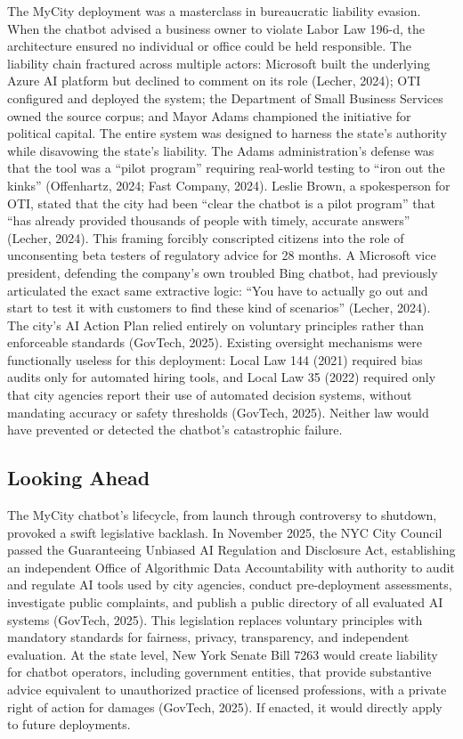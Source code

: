 \documentclass[10pt, twocolumn]{article}
\begin{document}
The MyCity deployment was a masterclass in bureaucratic liability evasion. When the chatbot advised a business owner to violate Labor Law 196-d, the architecture ensured no individual or office could be held responsible. The liability chain fractured across multiple actors: Microsoft built the underlying Azure AI platform but declined to comment on its role (Lecher, 2024); OTI configured and deployed the system; the Department of Small Business Services owned the source corpus; and Mayor Adams championed the initiative for political capital. The entire system was designed to harness the state's authority while disavowing the state's liability. The Adams administration's defense was that the tool was a ``pilot program'' requiring real-world testing to ``iron out the kinks'' (Offenhartz, 2024; Fast Company, 2024). Leslie Brown, a spokesperson for OTI, stated that the city had been ``clear the chatbot is a pilot program'' that ``has already provided thousands of people with timely, accurate answers'' (Lecher, 2024). This framing forcibly conscripted citizens into the role of unconsenting beta testers of regulatory advice for 28 months. A Microsoft vice president, defending the company's own troubled Bing chatbot, had previously articulated the exact same extractive logic: ``You have to actually go out and start to test it with customers to find these kind of scenarios'' (Lecher, 2024). The city's AI Action Plan relied entirely on voluntary principles rather than enforceable standards (GovTech, 2025). Existing oversight mechanisms were functionally useless for this deployment: Local Law 144 (2021) required bias audits only for automated hiring tools, and Local Law 35 (2022) required only that city agencies report their use of automated decision systems, without mandating accuracy or safety thresholds (GovTech, 2025). Neither law would have prevented or detected the chatbot's catastrophic failure.

\subsection*{Looking Ahead}

The MyCity chatbot's lifecycle, from launch through controversy to shutdown, provoked a swift legislative backlash. In November 2025, the NYC City Council passed the Guaranteeing Unbiased AI Regulation and Disclosure Act, establishing an independent Office of Algorithmic Data Accountability with authority to audit and regulate AI tools used by city agencies, conduct pre-deployment assessments, investigate public complaints, and publish a public directory of all evaluated AI systems (GovTech, 2025). This legislation replaces voluntary principles with mandatory standards for fairness, privacy, transparency, and independent evaluation. At the state level, New York Senate Bill 7263 would create liability for chatbot operators, including government entities, that provide substantive advice equivalent to unauthorized practice of licensed professions, with a private right of action for damages (GovTech, 2025). If enacted, it would directly apply to future deployments.
\end{document}
